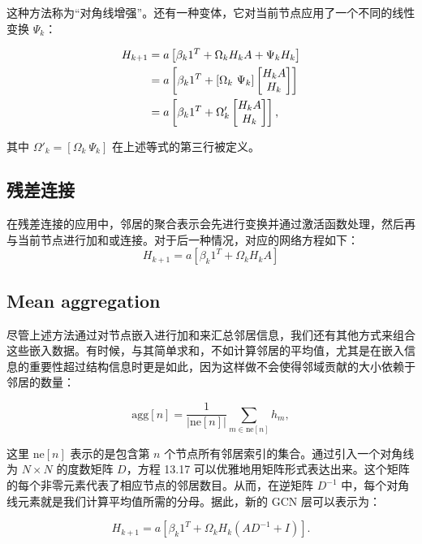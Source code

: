 \documentclass[lang=cn,newtx,10pt,scheme=chinese]{elegantbook}
\begin{document}
这种方法称为“对角线增强”。还有一种变体，它对当前节点应用了一个不同的线性变换 \(\Psi_k\)：


\begin{align}
H_{k+1} &= a \left[ \beta_{k} 1^T + \Omega_k H_k A + \Psi_k H_k \right] \notag \\
&= a \left[ \beta_{k} 1^T + \left[ \Omega_k \ \Psi_k \right] \begin{bmatrix} H_k A \\ H_k \end{bmatrix} \right] \notag \\
&= a \left[ \beta_{k} 1^T + \Omega'_k \begin{bmatrix} H_k A \\ H_k \end{bmatrix} \right], 
\end{align} 


其中 \(\Omega'_k = \left[ \Omega_k \ \Psi_k \right]\) 在上述等式的第三行被定义。

\subsection{残差连接}
在残差连接的应用中，邻居的聚合表示会先进行变换并通过激活函数处理，然后再与当前节点进行加和或连接。对于后一种情况，对应的网络方程如下：
\begin{equation}
H_{k+1} = a \left[ \beta_k 1^T + \Omega_k H_k A \right] 
\end{equation}
\subsection{Mean aggregation}
尽管上述方法通过对节点嵌入进行加和来汇总邻居信息，我们还有其他方式来组合这些嵌入数据。有时候，与其简单求和，不如计算邻居的平均值，尤其是在嵌入信息的重要性超过结构信息时更是如此，因为这样做不会使得邻域贡献的大小依赖于邻居的数量：

\begin{equation}
\text{agg}[n] = \frac{1}{|\text{ne}[n]|} \sum_{m \in \text{ne}[n]} h_m, 
\end{equation}

这里 \(\text{ne}[n]\) 表示的是包含第 \(n\) 个节点所有邻居索引的集合。通过引入一个对角线为 \(N \times N\) 的度数矩阵 \(D\)，方程 13.17 可以优雅地用矩阵形式表达出来。这个矩阵的每个非零元素代表了相应节点的邻居数目。从而，在逆矩阵 \(D^{-1}\) 中，每个对角线元素就是我们计算平均值所需的分母。据此，新的 GCN 层可以表示为：

\begin{equation}
H_{k+1} = a \left[ \beta_k 1^T + \Omega_k H_k (AD^{-1} + I) \right]. 
\end{equation}
\end{document}
